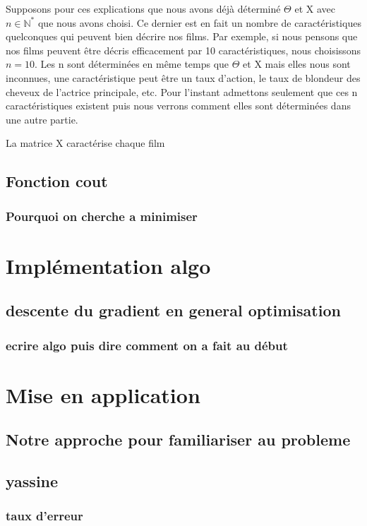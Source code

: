 \documentclass[a4paper,10pt]{article}
\begin{document}
Supposons pour ces explications que nous avons déjà déterminé $\Theta$ et X avec $n \in \mathbb{N}^*$ que nous avons choisi. Ce dernier est en fait un nombre de caractéristiques quelconques qui peuvent bien décrire nos films. Par exemple, si nous pensons que nos films peuvent être décris efficacement par 10 caractéristiques, nous choisissons $n = 10$.
Les n sont déterminées en même temps que $\Theta$ et X mais elles nous sont inconnues, une caractéristique peut être un taux d'action, le taux de blondeur des cheveux de l'actrice principale, etc. Pour l'instant admettons seulement que ces n caractéristiques existent puis nous verrons comment elles sont déterminées dans une autre partie.

La matrice X caractérise chaque film




\subsection{Fonction cout}
\subsubsection{Pourquoi on cherche a minimiser}
\section{Implémentation algo}
\subsection{descente du gradient en general optimisation}
\subsubsection{ecrire algo puis dire comment on a fait au début}
\section{Mise en application}
\subsection{Notre approche pour familiariser au probleme}
\subsection{yassine}
\subsubsection{taux d'erreur}
\end{document}
